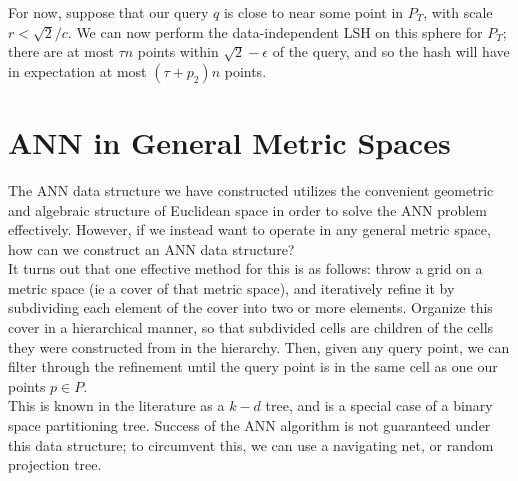 For now, suppose that our query $q$ is close to near some point in $P_T$, with scale $r < \sqrt{2}/c$. We can now perform the data-independent LSH on this sphere for $P_T$; there are at most $\tau n$ points within $\sqrt{2} - \epsilon$ of the query, and so the hash will have in expectation at most $(\tau + p_2)n$ points.

\section{ANN in General Metric Spaces}

The ANN data structure we have constructed utilizes the convenient geometric and algebraic structure of Euclidean space
in order to solve the ANN problem effectively. However, if we instead want to operate in any general metric space,
how can we construct an ANN data structure? \\

It turns out that one effective method for this is as follows: throw a grid on a metric space (ie a cover of that metric space),
and iteratively refine it by subdividing each element of the cover into two or more elements. Organize this cover in a hierarchical
manner, so that subdivided cells are children of the cells they were constructed from in the hierarchy. Then, given any query point,
we can filter through the refinement until the query point is in the same cell as one our points $p \in P$. \\

This is known in the literature as a $k-d$ tree, and is a special case of a binary space partitioning tree. Success of the ANN algorithm
is not guaranteed under this data structure; to circumvent this, we can use a navigating net, or random projection tree.
